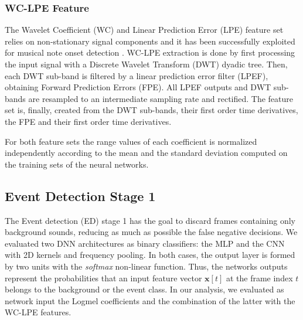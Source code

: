 \subsubsection{WC-LPE Feature}
The Wavelet Coefficient (WC) and Linear Prediction Error (LPE) feature set relies on non-stationary signal components and it has been successfully exploited for musical note onset detection \cite{marchi2014multi}. WC-LPE extraction is done by first processing the input signal with a Discrete Wavelet Transform (DWT) dyadic tree. Then, each DWT sub-band is filtered by a linear prediction error filter (LPEF), obtaining Forward Prediction Errors (FPE). All LPEF outputs and DWT sub-bands are resampled to an intermediate sampling rate and rectified. The feature set is, finally, created from the DWT sub-bands, their first order time derivatives, the FPE and their first order time derivatives.

For both feature sets the range values of each coefficient is normalized independently according to the mean and the standard deviation computed on the training sets of the neural networks.

\subsection{Event Detection Stage 1}
\label{ssec:first_stage}
The Event detection (ED) stage 1 has the goal to discard frames containing only background sounds, reducing as much as possible the false negative decisions.
We evaluated two DNN architectures as binary classifiers: the MLP and the CNN with 2D kernels and frequency pooling. In both cases, the output layer is formed by two units with the \textit{softmax} non-linear function. Thus, the networks outputs represent the probabilities that an input feature vector $\mathbf{x}[t]$ at the frame index $t$ belongs to the background or the event class. In our analysis, we evaluated as network input the Logmel coefficients and the combination of the latter with the WC-LPE features.

